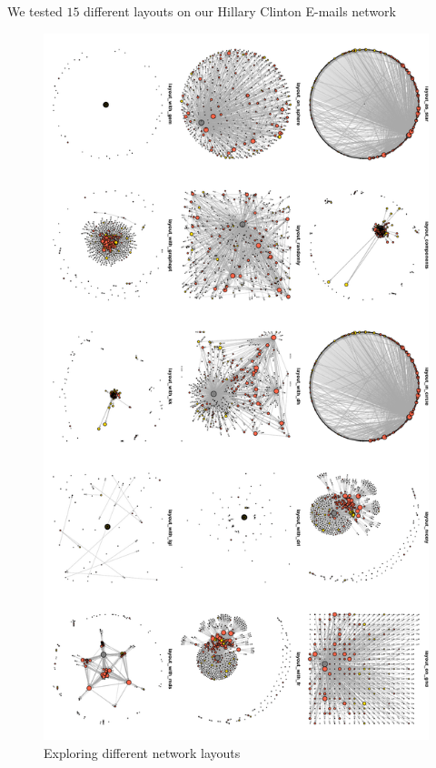 We tested $15$ different layouts on our Hillary Clinton E-mails network
\begin{figure}[ht]
\centering
\caption{Exploring different network layouts}
\label{fig:trylayout}
\includegraphics[width=.5\textwidth]{report_explore_layout}
\end{figure}